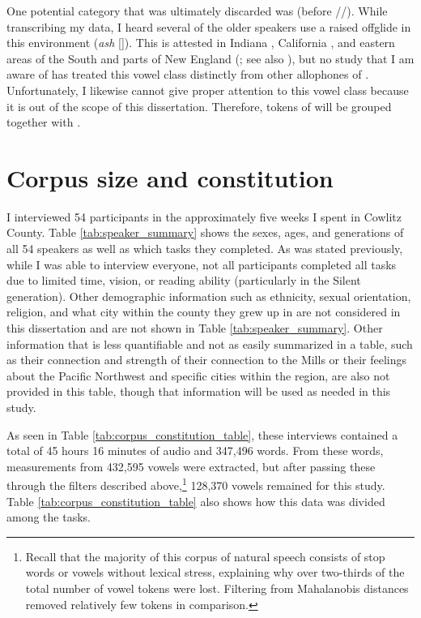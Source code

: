 One potential category that was ultimately discarded was \bash (\trap before //). While transcribing my data, I heard several of the older speakers use a raised offglide in this environment (\textit{ash} []). This is attested in Indiana \citep{carmony_1970}, California \citep{galloway_1967}, and eastern areas of the South and parts of New England (\citealt[104]{kurath_mcdavid_1961}; see also \citealt[41--42, footnote 27]{labov_1991}), but no study that I am aware of has treated this vowel class distinctly from other allophones of \trap. Unfortunately, I likewise cannot give proper attention to this vowel class because it is out of the scope of this dissertation. Therefore, tokens of \bash will be grouped together with \bat.




\section{Corpus size and constitution}
\label{corpus_size_constitution}

I interviewed 54 participants in the approximately five weeks I spent in Cowlitz County. Table \ref{tab:speaker_summary} shows the sexes, ages, and generations of all 54 speakers as well as which tasks they completed. As was stated previously, while I was able to interview everyone, not all participants completed all tasks due to limited time, vision, or reading ability (particularly in the Silent generation). Other demographic information such as ethnicity, sexual orientation, religion, and what city within the county they grew up in are not considered in this dissertation and are not shown in Table \ref{tab:speaker_summary}. Other information that is less quantifiable and not as easily summarized in a table, such as their connection and strength of their connection to the Mills or their feelings about the Pacific Northwest and specific cities within the region, are also not provided in this table, though that information will be used as needed in this study.



As seen in Table \ref{tab:corpus_constitution_table}, these interviews contained a total of 45 hours 16 minutes of audio and 347,496 words. From these words, measurements from 432,595 vowels were extracted, but after passing these through the filters described above,\footnote{Recall that the majority of this corpus of natural speech consists of stop words or vowels without lexical stress, explaining why over two-thirds of the total number of vowel tokens were lost. Filtering from Mahalanobis distances removed relatively few tokens in comparison.} 128,370 vowels remained for this study. Table \ref{tab:corpus_constitution_table} also shows how this data was divided among the tasks.

